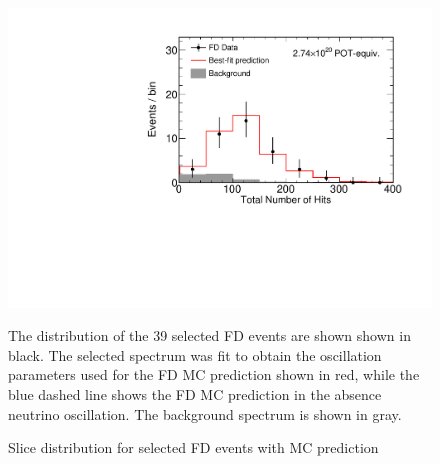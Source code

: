\begin{figure}
\begin{center}
\includegraphics[width=\textwidth]{figures/results/fd_data_mc_numi_plots/nhit_unblind.pdf}
\end{center}
\caption{  Slice \nhit distribution for selected FD events with MC prediction }{
The distribution of the 39 selected FD events are shown shown in black.
The selected spectrum was fit to obtain the oscillation parameters used
for the FD MC prediction shown in red, while
the blue dashed line shows the FD MC prediction in the absence neutrino
oscillation.
The background spectrum is shown in gray.
}
\label{nhit_unblind}

\end{figure}



